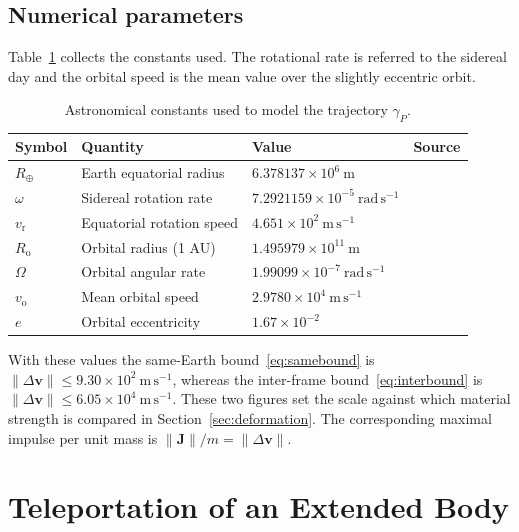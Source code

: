 \documentclass[11pt]{article}
\begin{document}
	\subsection{Numerical parameters}
	
	Table~\ref{tab:constants} collects the constants used. The rotational
	rate is referred to the sidereal day and the orbital speed is the mean
	value over the slightly eccentric orbit.
	
	\begin{table}[htbp]
		\centering
		\begin{tabular}{@{}llll@{}}
			\toprule
			Symbol & Quantity & Value & Source \\
			\midrule
			$R_{\oplus}$ & Earth equatorial radius
			& $6.378137\times10^{6}\ \mathrm{m}$
			& \cite{WGS84,NASAEarthFactSheet} \\
			$\omega$ & Sidereal rotation rate
			& $7.2921159\times10^{-5}\ \mathrm{rad\,s^{-1}}$
			& \cite{IERS2010,NASAEarthFactSheet} \\
			$v_{\mathrm r}$ & Equatorial rotation speed
			& $4.651\times10^{2}\ \mathrm{m\,s^{-1}}$
			& \cite{NASAEarthFactSheet} \\
			$R_{\mathrm o}$ & Orbital radius (1 AU)
			& $1.495979\times10^{11}\ \mathrm{m}$
			& \cite{IAU2012,NASAEarthFactSheet} \\
			$\Omega$ & Orbital angular rate
			& $1.99099\times10^{-7}\ \mathrm{rad\,s^{-1}}$
			& \cite{NASAEarthFactSheet} \\
			$v_{\mathrm o}$ & Mean orbital speed
			& $2.9780\times10^{4}\ \mathrm{m\,s^{-1}}$
			& \cite{NASAEarthFactSheet} \\
			$e$ & Orbital eccentricity
			& $1.67\times10^{-2}$
			& \cite{NASAEarthFactSheet} \\
			\bottomrule
		\end{tabular}
		\caption{Astronomical constants used to model the trajectory
			$\gamma_P$.}
		\label{tab:constants}
	\end{table}
	
	With these values the same-Earth bound~\eqref{eq:samebound} is
	$\|\Delta\mathbf v\|\le 9.30\times10^{2}\ \mathrm{m\,s^{-1}}$, whereas
	the inter-frame bound~\eqref{eq:interbound} is
	$\|\Delta\mathbf v\|\le 6.05\times10^{4}\ \mathrm{m\,s^{-1}}$. These two
	figures set the scale against which material strength is compared in
	Section~\ref{sec:deformation}. The corresponding maximal impulse per
	unit mass is $\|\mathbf J\|/m=\|\Delta\mathbf v\|$.
	
	\section{Teleportation of an Extended Body}
	\label{sec:extended}
	
\end{document}
